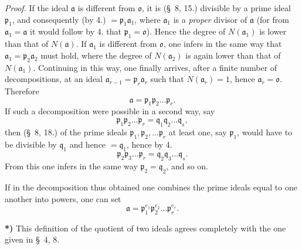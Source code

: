 \documentclass{article}
\begin{document}
\emph{Proof.} If the ideal $\mathfrak{a}$ is different from $\mathfrak{o}$, it is (§~8, 15.) divisible by a prime ideal $\mathfrak{p}_{1}$, and consequently (by 4.) $= \mathfrak{p}_{1}\mathfrak{a}_{1}$, where $\mathfrak{a}_{1}$ is a \emph{proper} divisor of $\mathfrak{a}$ (for from $\mathfrak{a}_{1} = \mathfrak{a}$ it would follow by 4. that $\mathfrak{p}_{1} = \mathfrak{o}$). Hence the degree of $N(\mathfrak{a}_{1})$ is lower than that of $N(\mathfrak{a})$. If $\mathfrak{a}_{1}$ is different from $\mathfrak{o}$, one infers in the same way that $\mathfrak{a}_{1} = \mathfrak{p}_{2}\mathfrak{a}_{2}$ must hold, where the degree of $N(\mathfrak{a}_{2})$ is again lower than that of $N(\mathfrak{a}_{1})$. Continuing in this way, one finally arrives, after a finite number of decompositions, at an ideal $\mathfrak{a}_{r-1} = \mathfrak{p}_{r}\mathfrak{a}_{r}$ such that $N(\mathfrak{a}_{r}) = 1$, hence $\mathfrak{a}_{r} = \mathfrak{o}$. Therefore
\[ \mathfrak{a} = \mathfrak{p}_{1}\mathfrak{p}_{2}\ldots\mathfrak{p}_{r}. \]
If such a decomposition were possible in a second way, say
\[ \mathfrak{p}_{1}\mathfrak{p}_{2}\ldots\mathfrak{p}_{r} = \mathfrak{q}_{1}\mathfrak{q}_{2}\ldots\mathfrak{q}_{s}, \]
then (§~8, 18.) of the prime ideals $\mathfrak{p}_{1}, \mathfrak{p}_{2}, \ldots \mathfrak{p}_{r}$ at least one, say $\mathfrak{p}_{1}$, would have to be divisible by $\mathfrak{q}_{1}$ and hence $= \mathfrak{q}_{1}$, hence by 4.
\[ \mathfrak{p}_{2}\mathfrak{p}_{3}\ldots\mathfrak{p}_{r} = \mathfrak{q}_{2}\mathfrak{q}_{3}\ldots\mathfrak{q}_{s}. \]
From this one infers in the same way $\mathfrak{p}_{2} = \mathfrak{q}_{2}$, and so on.

If in the decomposition thus obtained one combines the prime ideals equal to one another into powers, one can set
\[ \mathfrak{a} = \mathfrak{p}_{1}^{e_{1}}\mathfrak{p}_{2}^{e_{2}}\ldots\mathfrak{p}_{r}^{e_{r}}. \]

\textbf{*)} This definition of the quotient of two ideals agrees completely with the one given in §~4, 8.

\end{document}
